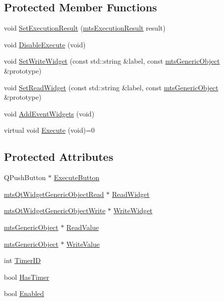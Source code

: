 \subsection*{Protected Member Functions}
\begin{DoxyCompactItemize}
\item 
void \hyperlink{classmts_qt_widget_function_a601e9e96839fe89f35a73b0740bd7758}{Set\+Execution\+Result} (\hyperlink{classmts_execution_result}{mts\+Execution\+Result} result)
\item 
void \hyperlink{classmts_qt_widget_function_af7d8ef8071db0595820c6b3646b49d42}{Disable\+Execute} (void)
\item 
void \hyperlink{classmts_qt_widget_function_af41703d3e97486e4ea35b05d831d6168}{Set\+Write\+Widget} (const std\+::string \&label, const \hyperlink{classmts_generic_object}{mts\+Generic\+Object} \&prototype)
\item 
void \hyperlink{classmts_qt_widget_function_a30a3d1b87ecc5594a486ee1cc91023e8}{Set\+Read\+Widget} (const std\+::string \&label, const \hyperlink{classmts_generic_object}{mts\+Generic\+Object} \&prototype)
\item 
void \hyperlink{classmts_qt_widget_function_a302ae69b493245debfcb097bd1f5170e}{Add\+Event\+Widgets} (void)
\item 
virtual void \hyperlink{classmts_qt_widget_function_a2cc4ca75284e81bee8709a70c7b4a231}{Execute} (void)=0
\end{DoxyCompactItemize}
\subsection*{Protected Attributes}
\begin{DoxyCompactItemize}
\item 
Q\+Push\+Button $\ast$ \hyperlink{classmts_qt_widget_function_ade106b082a43dd9521e2d337d6eaed4d}{Execute\+Button}
\item 
\hyperlink{classmts_qt_widget_generic_object_read}{mts\+Qt\+Widget\+Generic\+Object\+Read} $\ast$ \hyperlink{classmts_qt_widget_function_a333d0068c3806b9f53ce88c951b5269b}{Read\+Widget}
\item 
\hyperlink{classmts_qt_widget_generic_object_write}{mts\+Qt\+Widget\+Generic\+Object\+Write} $\ast$ \hyperlink{classmts_qt_widget_function_a4601b0dcc1cdf04274dd9d924e5b49c5}{Write\+Widget}
\item 
\hyperlink{classmts_generic_object}{mts\+Generic\+Object} $\ast$ \hyperlink{classmts_qt_widget_function_a8aaeaa7548a0418ec88d948e01155403}{Read\+Value}
\item 
\hyperlink{classmts_generic_object}{mts\+Generic\+Object} $\ast$ \hyperlink{classmts_qt_widget_function_a0e56b1cd0270cbbbb914602ace6f1586}{Write\+Value}
\item 
int \hyperlink{classmts_qt_widget_function_a9d0fde621a8e282ed207854d6f772a7d}{Timer\+I\+D}
\item 
bool \hyperlink{classmts_qt_widget_function_a0dd74f0d0cec1225c98c06c8ee231b12}{Has\+Timer}
\item 
bool \hyperlink{classmts_qt_widget_function_af20ae57edf9ba7c3404b00eb3fcee728}{Enabled}
\end{DoxyCompactItemize}


